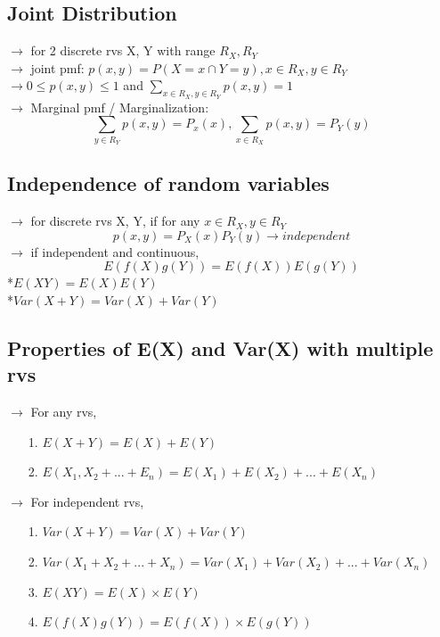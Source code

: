 \documentclass{article}
\begin{document}
\subsection{Joint Distribution}
$\rightarrow$ for 2 discrete rvs X, Y with range $R_X, R_Y$\\
$\rightarrow$ joint pmf: $p(x,y) = P({X=x} \cap {Y=y}), x \in R_X, y \in R_Y$\\
$\rightarrow 0 \leq p(x,y) \leq 1$ and $\sum_{x\in R_X, y \in R_Y} p(x,y)=1$\\
$\rightarrow$ Marginal pmf / Marginalization:\\
\[\sum_{y\in R_Y}p(x,y)=P_x(x),\sum_{x\in R_X}p(x,y)=P_Y(y)\]
\subsection{Independence of random variables}
$\rightarrow$ for discrete rvs X, Y, if for any $x \in R_X, y \in R_Y$
\[p(x,y)=P_X(x)P_Y(y) \rightarrow independent\]
$\rightarrow$ if independent and continuous,\\
\[E(f(X)g(Y)) = E(f(X))E(g(Y))\]
*$E(XY) = E(X)E(Y)$\\
*$Var(X+Y) = Var(X) + Var(Y)$\\
\subsection{Properties of E(X) and Var(X) with multiple rvs}
$\rightarrow$ For any rvs,
\begin{itemize}
    \item [1.] $E(X+Y) = E(X) +E(Y)$
    \item[2.] $E(X_1, X_2+...+E_n) = E(X_1) +E(X_2)+...+E(X_n)$
\end{itemize}
$\rightarrow$ For independent rvs,
\begin{itemize}
    \item [1.] $Var(X+Y)= Var(X) +Var(Y)$
    \item [2.] $Var(X_1+X_2+...+X_n) = Var(X_1)+Var(X_2) +...+Var(X_n)$
    \item[3.] $E(XY) = E(X) \times E(Y)$
    \item [4.] $E(f(X)g(Y)) = E(f(X)) \times E(g(Y))$
\end{itemize}
\end{document}
